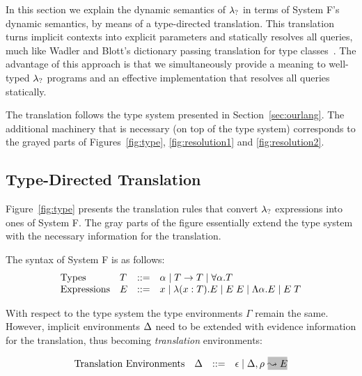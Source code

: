 In this section we explain the dynamic semantics of $\lambda_{?}$ in terms
of System F's dynamic semantics, by means of a type-directed translation. 
This translation turns implicit contexts into explicit parameters and
statically resolves all queries, much like Wadler and Blott's dictionary
passing translation for type classes~\cite{adhoc}. 
The advantage of this approach is that we simultaneously provide a meaning to
well-typed $\lambda_{?}$ programs and an effective implementation that resolves
all queries statically.

The translation follows the type system presented in Section~\ref{sec:ourlang}.
The additional machinery that is necessary (on top of the type system)
corresponds to the grayed parts of Figures~\ref{fig:type}, \ref{fig:resolution1} and \ref{fig:resolution2}. 

\subsection{Type-Directed Translation}
Figure~\ref{fig:type} presents the translation rules that convert $\lambda_{?}$
expressions into ones of System F. 
The gray parts of the figure essentially extend the type system with the necessary
information for the translation.

The syntax of System F is as follows: 
{\small
  \[ \begin{array}{llrl}
    \text{Types} & T & ::= & \alpha \mid T \rightarrow T 
    \mid \forall \alpha. T \\ 
    \text{Expressions} & E & ::=  & x \mid \lambda (x:T) . E \mid E\;E
    \mid \Lambda \alpha . E \mid E\;T 
  \end{array} \]}

With respect to the type system the type environments $\Gamma$ remain
the same. However, implicit environments $\Delta$ need to be extended with
evidence information for the translation, thus becoming
\emph{translation} environments:

{\small
  \[ \begin{array}{llrl}
\text{Translation Environments} & \env & ::= & \epsilon \mid \env, \rulet~\gbox{\leadsto E} \\
  \end{array} \]}

